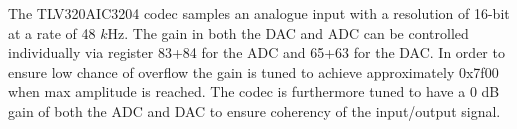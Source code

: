The TLV320AIC3204 codec samples an analogue input with a resolution of 16-bit at a rate of 48 $k$Hz. The gain in both the DAC and ADC can be controlled individually via register 83+84 for the ADC and 65+63 for the DAC. In order to ensure low chance of overflow the gain is tuned to achieve approximately 0x7f00 when max amplitude is reached. The codec is furthermore tuned to have a 0 dB gain of both the ADC and DAC to ensure coherency of the input/output signal.

%


%
%
%
%
